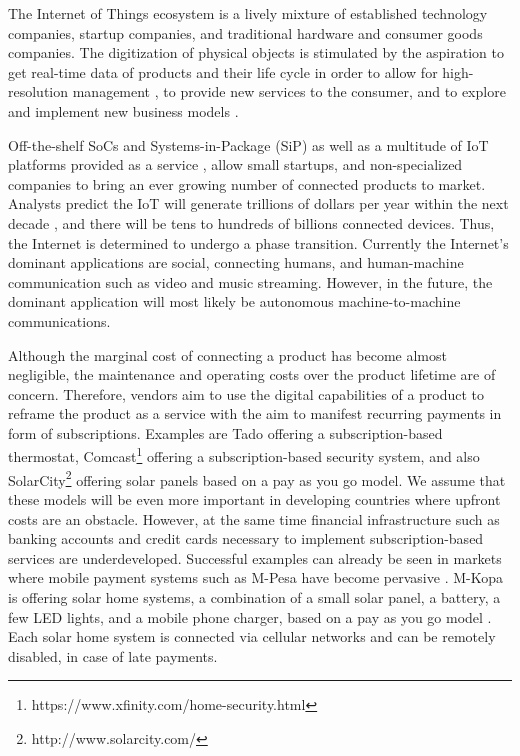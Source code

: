 The Internet of Things ecosystem is a lively mixture of established technology companies, startup companies, and traditional hardware and consumer goods companies. The digitization of physical objects is stimulated by the aspiration to get real-time data of products and their life cycle in order to allow for high-resolution management \parencite{fleisch2010internet}, to provide new services to the consumer, and to explore and implement new business models \parencite{Fleisch2015}.	

Off-the-shelf SoCs and Systems-in-Package (SiP) as well as a multitude of IoT platforms provided as a service \parencite{ISI:000379632700002}, allow small startups, and non-specialized companies to bring an ever growing number of connected products to market. Analysts predict the IoT will generate trillions of dollars per year within the next decade \parencite{manyika2015unlocking}, and there will be tens to hundreds of billions connected devices. Thus, the Internet is determined to undergo a phase transition. Currently the Internet's dominant applications are social, connecting humans, and human-machine communication such as video and music streaming. However, in the future, the dominant application will most likely be autonomous machine-to-machine communications. 

Although the marginal cost of connecting a product has become almost negligible, the maintenance and operating costs over the product lifetime are of concern. Therefore, vendors aim to use the digital capabilities of a product to reframe the product as a service with the aim to manifest recurring payments in form of subscriptions. Examples are Tado offering a subscription-based thermostat, Comcast\footnote{https://www.xfinity.com/home-security.html} offering a subscription-based security system, and also SolarCity\footnote{http://www.solarcity.com/} offering solar panels based on a pay as you go model. We assume that these models will be even more important in developing countries where upfront costs are an obstacle. However, at the same time financial infrastructure such as banking accounts and credit cards necessary to implement subscription-based services are underdeveloped. Successful examples can already be seen in markets where mobile payment systems such as M-Pesa have become pervasive \parencite{hughes2007m}. M-Kopa is offering solar home systems, a combination of a small solar panel, a battery, a few LED lights, and a mobile phone charger, based on a pay as you go model \parencite{ISI:000351842100012}. Each solar home system is connected via cellular networks and can be remotely disabled, in case of late payments. 

